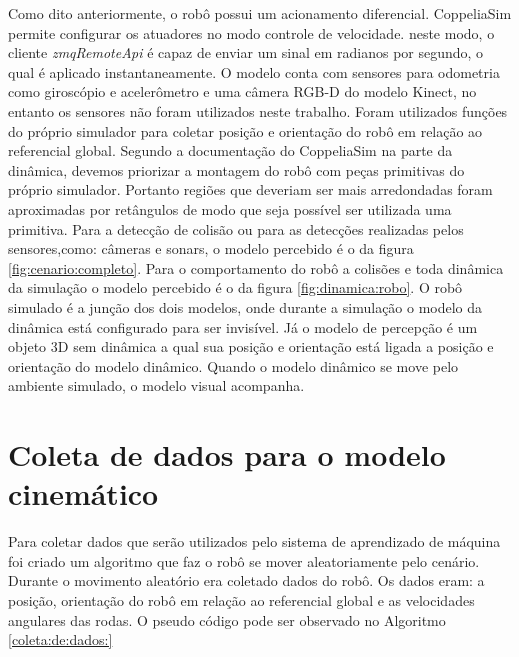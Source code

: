 Como dito anteriormente, o robô possui um acionamento diferencial.
CoppeliaSim permite configurar os atuadores no modo controle de
velocidade. neste modo, o cliente \textit{zmqRemoteApi} é capaz de enviar
um sinal em radianos por segundo, o qual é aplicado instantaneamente.
O modelo conta com sensores para odometria como giroscópio e acelerômetro
e uma câmera RGB-D do modelo Kinect, no entanto os sensores não foram
utilizados neste trabalho.
Foram utilizados funções do próprio simulador para coletar posição e 
orientação do robô em relação ao referencial global.
Segundo a documentação do CoppeliaSim na parte da dinâmica,
devemos priorizar a montagem do robô com peças primitivas do próprio
simulador. Portanto regiões que deveriam ser mais arredondadas foram
aproximadas por retângulos de modo que seja possível ser utilizada uma
primitiva. Para a detecção de colisão ou para as detecções realizadas
pelos sensores,como: câmeras e sonars, o modelo percebido é o da figura
\ref{fig:cenario:completo}. Para o comportamento do robô a colisões e toda dinâmica da simulação
o modelo percebido é o da figura \ref{fig:dinamica:robo}. O robô simulado é a junção dos dois
modelos, onde durante a simulação o modelo da dinâmica está configurado para ser invisível.
Já o modelo de percepção é um objeto 3D sem dinâmica a qual sua posição e orientação
está ligada a posição e orientação do modelo dinâmico. Quando o modelo dinâmico se
move pelo ambiente simulado, o modelo visual acompanha. 


\section{Coleta de dados para o modelo cinemático}
Para coletar dados que serão utilizados pelo sistema de aprendizado de máquina
foi criado um algoritmo que faz o robô se mover aleatoriamente pelo cenário.
Durante o movimento aleatório era coletado dados do robô.
Os dados eram: a posição, orientação do robô em relação ao referencial global e
as velocidades angulares das rodas. O pseudo código pode ser observado no Algoritmo \ref{coleta:de:dados:}

